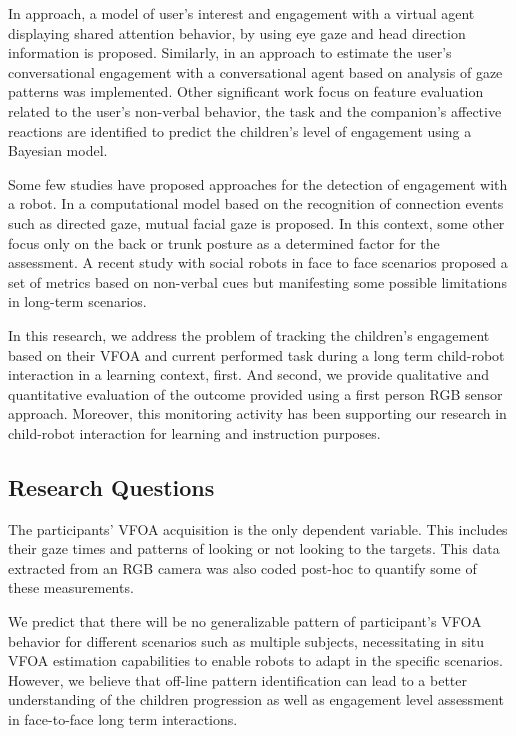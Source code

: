 \documentclass{sig-alternate}
\begin{document}
In \cite{peters2010investigating} approach, a model of user's interest and
engagement with a virtual agent displaying shared attention behavior, by using
eye gaze and head direction information is proposed. Similarly, in
\cite{nakano2010estimating} an approach to estimate the user's conversational
engagement with a conversational agent based on analysis of gaze patterns was
implemented. Other significant work \cite{Castellano:2009} focus on feature
evaluation related to the user's non-verbal behavior, the task and the
companion's affective reactions are identified to predict the children's level
of engagement using a Bayesian model.

Some few studies have proposed approaches for the detection of engagement with a
robot. In \cite{Rich:2010} a computational model based on the recognition of
connection events such as directed gaze, mutual facial gaze is proposed. In this
context, some other \cite{Sanghvi:2011} focus only on the back or trunk posture
as a determined factor for the assessment. A recent study \cite{anzalone} with
social robots in face to face scenarios proposed a set of metrics based on
non-verbal cues but manifesting some possible limitations in long-term
scenarios.

In this research, we address the problem of tracking the children's engagement
based on their VFOA and current performed task during a long term child-robot
interaction in a learning context, first. And second, we provide qualitative and
quantitative evaluation of the outcome provided using a first person RGB sensor
approach. Moreover, this monitoring activity has been supporting our research in
child-robot interaction for learning and instruction purposes.


\subsection{Research Questions}

The participants' VFOA acquisition is the only dependent variable. This includes
their gaze times and patterns of looking or not looking to the targets. This
data extracted from an RGB camera was also coded post-hoc to quantify some of
these measurements.

We predict that there will be no generalizable pattern of participant's VFOA
behavior for different scenarios such as multiple subjects, necessitating in
situ VFOA estimation capabilities to enable robots to adapt in the specific
scenarios. However, we believe that off-line pattern identification can lead to
a better understanding of the children progression as well as engagement level
assessment in face-to-face long term interactions.
\end{document}
